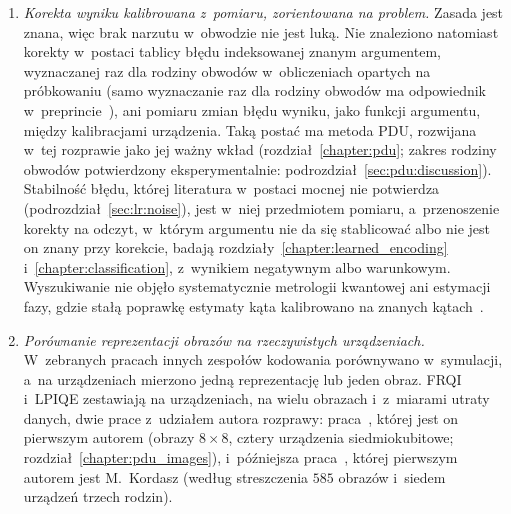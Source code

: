 \begin{enumerate}
\renewcommand{\theenumi}{\alph{enumi}}
\renewcommand{\labelenumi}{(\theenumi)}
\item\label{itm:lr:gap:a} \emph{Korekta wyniku kalibrowana z~pomiaru, zorientowana na problem.}
Zasada jest znana, więc brak narzutu w~obwodzie nie jest luką.
Nie znaleziono natomiast korekty w~postaci tablicy błędu indeksowanej znanym argumentem, wyznaczanej raz dla rodziny obwodów w~obliczeniach opartych na próbkowaniu (samo wyznaczanie raz dla rodziny obwodów ma odpowiednik w~preprincie~\cite{shen_circuit_2025}), ani pomiaru zmian błędu wyniku, jako funkcji argumentu, między kalibracjami urządzenia.
Taką postać ma metoda PDU, rozwijana w~tej rozprawie jako jej ważny wkład (rozdział~\ref{chapter:pdu}; zakres rodziny obwodów potwierdzony eksperymentalnie: podrozdział~\ref{sec:pdu:discussion}).
Stabilność błędu, której literatura w~postaci mocnej nie potwierdza (podrozdział~\ref{sec:lr:noise}), jest w~niej przedmiotem pomiaru, a~przenoszenie korekty na odczyt, w~którym argumentu nie da się stablicować albo nie jest on znany przy korekcie, badają rozdziały~\ref{chapter:learned_encoding} i~\ref{chapter:classification}, z~wynikiem negatywnym albo warunkowym.
Wyszukiwanie nie objęło systematycznie metrologii kwantowej ani estymacji fazy, gdzie stałą poprawkę estymaty kąta kalibrowano na znanych kątach~\cite{conlon_approaching_2023}.
\item\label{itm:lr:gap:b} \emph{Porównanie reprezentacji obrazów na rzeczywistych urządzeniach.}
W~zebranych pracach innych zespołów kodowania porównywano w~symulacji, a~na urządzeniach mierzono jedną reprezentację lub jeden obraz.
FRQI i~LPIQE zestawiają na urządzeniach, na wielu obrazach i~z~miarami utraty danych, dwie prace z~udziałem autora rozprawy: praca~\cite{werner_data_loss_2023}, której jest on pierwszym autorem (obrazy $8\times8$, cztery urządzenia siedmiokubitowe; rozdział~\ref{chapter:pdu_images}), i~późniejsza praca~\cite{kordasz_image_encoding_2025}, której pierwszym autorem jest M.~Kordasz (według streszczenia $585$ obrazów i~siedem urządzeń trzech rodzin).

\end{enumerate}
